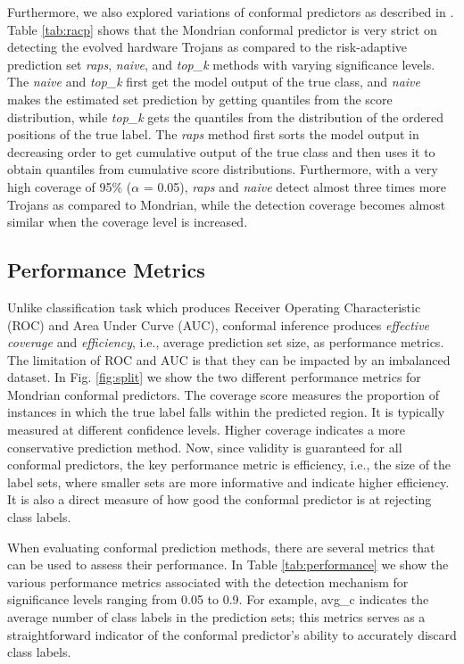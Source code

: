 \documentclass[9pt,conference]{IEEEtran}
\begin{document}
Furthermore, we also explored variations of conformal predictors as described in \cite{bates2021distribution}. Table \ref{tab:racp} shows that the Mondrian conformal predictor is very strict on detecting the evolved hardware Trojans as compared to the risk-adaptive prediction set \textit{raps}, \textit{naive}, and \textit{top\_k} methods with varying significance levels. The \textit{naive} and \textit{top\_k} first get the model output of the true class, and \textit{naive} makes the estimated set prediction by getting quantiles from the score distribution, while \textit{top\_k} gets the quantiles from the distribution of the ordered positions of the true label. The \textit{raps} method first sorts the model output in decreasing order to get cumulative output of the true class and then uses it to obtain quantiles from cumulative score distributions. Furthermore, with a very high coverage of 95\% ($\alpha$ = 0.05), \textit{raps} and \textit{naive} detect almost three times more Trojans as compared to Mondrian, while the detection coverage becomes almost similar when the coverage level is increased.


\subsection{Performance Metrics}
\label{Sec:Performance}
Unlike classification task which produces Receiver Operating Characteristic (ROC) and Area Under Curve (AUC), conformal inference produces \textit{effective coverage} and \textit{efficiency}, i.e., average prediction set size, as performance metrics. The limitation of ROC and AUC is that they can be impacted by an imbalanced dataset. In Fig. \ref{fig:split} we show the two different performance metrics for Mondrian conformal predictors. The coverage score measures the proportion of instances in which the true label falls within the predicted region. It is typically measured at different confidence levels. Higher coverage indicates a more conservative prediction method. Now, since validity is guaranteed for all conformal predictors, the key performance metric is efficiency, i.e., the size of the label sets, where smaller sets are more informative and indicate higher efficiency. It is also a direct measure of how good the conformal predictor is at rejecting class labels.

When evaluating conformal prediction methods, there are several metrics that can be used to assess their performance. In Table \ref{tab:performance} we show the various performance metrics associated with the detection mechanism for significance levels ranging from 0.05 to 0.9. For example, avg\_c indicates the average number of class labels in the prediction sets; this metrics serves as a straightforward indicator of the conformal predictor's ability to accurately discard class labels.
\end{document}

